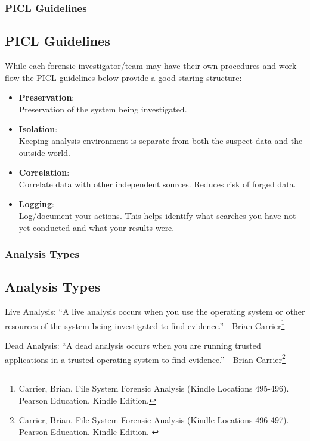 \documentclass{beamer}
\begin{document}
\begin{frame}
	\frametitle{PICL Guidelines}
	\subsection*{PICL Guidelines}
	While each forensic investigator/team may have their own procedures and work flow the PICL guidelines below provide a good staring structure:\\
	\vspace{\baselineskip}
	\begin{itemize}
		\item \textbf{Preservation}:\\	 Preservation of the system being investigated.
		\item \textbf{Isolation}:\\	 Keeping analysis environment is separate from both the suspect data and the outside world.
		\item \textbf{Correlation}:\\	 Correlate data with other independent sources. Reduces risk of forged data.
		\item \textbf{Logging}:\\	 Log/document your actions. This helps identify what searches you have not yet conducted and what your results were.
	\end{itemize}
\end{frame}

\begin{frame}
	\frametitle{Analysis Types}
	\subsection*{Analysis Types}
	\begin{block}{Live Analysis:}
		``A live analysis occurs when you use the operating system or other resources of the system being investigated to find evidence.'' - Brian Carrier\footnote{\tiny{Carrier, Brian. File System Forensic Analysis (Kindle Locations 495-496). Pearson Education. Kindle Edition.}}
	\end{block}

	\begin{block}{Dead Analysis:}
		``A dead analysis occurs when you are running trusted applications in a trusted operating system to find evidence.'' - Brian Carrier\footnote{\tiny{Carrier, Brian. File System Forensic Analysis (Kindle Locations 496-497). Pearson Education. Kindle Edition. }}
	\end{block}
\end{frame}
\end{document}
